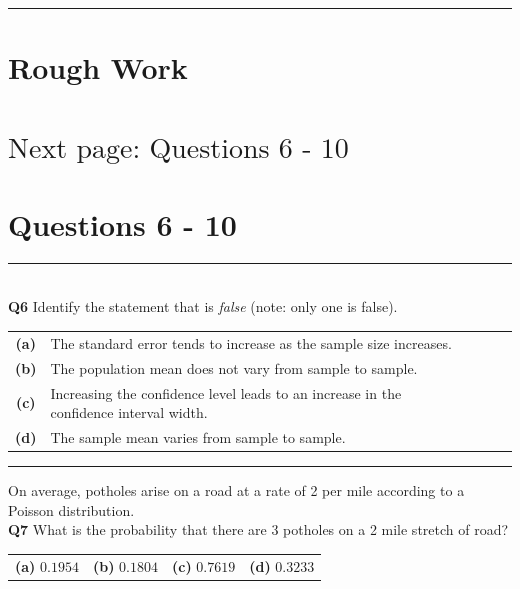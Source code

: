 \documentclass[12pt]{article}
\begin{document}
\quad

\rule{\linewidth}{1pt}

\newpage

\section*{Rough Work\\[23cm]}
\section*{\hspace{8cm}$\boxed{\text{Next page: Questions 6 - 10}}$}

\newpage


\section*{Questions 6 - 10}


\rule{\linewidth}{1pt}
\quad\\
{\bf Q6} Identify the statement that is \emph{false} (note: only one is false).\\[0.2cm]
\begin{tabular}{c@{\,\,\,}llll}
{\bf(a)} & The standard error tends to increase as the sample size increases.\\[0.2cm]
{\bf(b)} & The population mean does not vary from sample to sample. \\[0.2cm]
{\bf(c)} & Increasing the confidence level leads to an increase in the confidence interval width. \\[0.2cm]
{\bf(d)} & The sample mean varies from sample to sample. \\[0.6cm]
\end{tabular}


\rule{\linewidth}{1pt}
\quad

On average, potholes arise on a road at a rate of 2 per mile according to a Poisson distribution.\\[0.2cm]

{\bf Q7} What is the probability that there are 3 potholes on a 2 mile stretch of road?\\[0.2cm]
\begin{tabular}{cccc}
{\bf(a)} $0.1954$ & {\bf(b)} $0.1804$  & {\bf(c)} $0.7619$& {\bf(d)} $0.3233$ \\[0.6cm]
\end{tabular}
\end{document}
